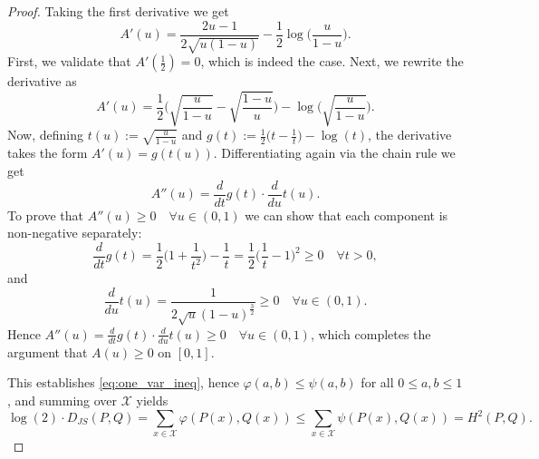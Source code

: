 \documentclass{article}
\begin{document}
\begin{proof}
Taking the first derivative we get
\[A'(u)=\frac{2u-1}{2\sqrt{u(1-u)}}-\frac{1}{2}\log \Big(\frac{u}{1-u} \Big).\]
First, we validate that $A'(\tfrac{1}{2})=0$, which is indeed the case. Next, we rewrite the derivative as
\[A'(u)=\frac{1}{2}\Bigg(\sqrt{\frac{u}{1-u}} - \sqrt{\frac{1-u}{u}} \Bigg) - \log \Bigg(\sqrt{\frac{u}{1-u}} \Bigg).\]
Now, defining $t(u) := \sqrt{\frac{u}{1-u}}$ and $g(t):= \frac{1}{2} \Big(t-\frac{1}{t} \Big) - \log(t)$, the derivative takes the form $A'(u)=g(t(u))$.
Differentiating again via the chain rule we get
\[A''(u)=\frac{d}{dt}g(t)\cdot \frac{d}{du}t(u).\]
To prove that $A''(u)\geq0 \quad \forall u \in (0,1)$ we can show that each component is non-negative separately:
\[\frac{d}{dt}g(t)=\frac{1}{2}\Big( 1 + \frac{1}{t^2} \Big) - \frac{1}{t}=\frac{1}{2}\Big( \frac{1}{t} - 1 \Big)^2 \geq 0 \quad \forall t > 0,\]
and
\[\frac{d}{du}t(u) = \frac{1}{2\sqrt{u}(1-u)^{\tfrac{3}{2}}} \geq 0 \quad \forall u\in(0,1).\]
Hence $A''(u)=\frac{d}{dt}g(t)\cdot \frac{d}{du}t(u) \geq0 \quad \forall u\in (0,1)$, which completes the argument that $A(u)\geq0$ on $[0,1]$.
 
This establishes \eqref{eq:one_var_ineq}, hence $\varphi(a,b)\leq\psi(a,b)$ for all $0\leq a,b\leq 1$, and summing over $\mathcal{X}$ yields
\begin{equation}
    \log(2) \cdot D_{JS}(P,Q) = \sum_{x\in\mathcal{X}} \varphi(P(x),Q(x)) \leq \sum_{x\in\mathcal{X}} \psi(P(x),Q(x)) = H^{2}(P,Q).
\label{eq:step3}
\end{equation}
\end{proof}
\end{document}
